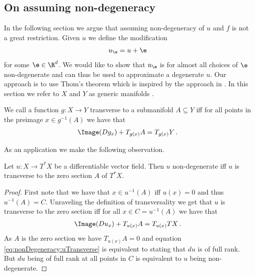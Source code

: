\subsection{On assuming non-degeneracy}

In the following section we argue that assuming non-degeneracy 
of $u$ and $f$ is not a great restriction.
Given $u$ we define the modification
\begin{align}
  u_\e=u+\e\label{eq:nonDegeneracy:definitionUEps}
\end{align}
for some $\e\in\R^d$. We would like to show that $u_\e$ is for almost all choices of $\e$ non-degenerate and can 
thus be used to approximate a degenerate $u$.
Our approach is to use Thom's theorem which is inspired by the approach in \cite[Chapter 6]{Hirsch1994}.
In this section we refer to $X$ and $Y$ as generic manifolds .
\begin{definition}[Transversality]
  We call a function $g\colon X\to Y$ transverse to a submanifold $A\subseteq Y$ iff for all points in the 
  preimage $x\in g^{-1}(A)$ we have that
  \begin{align*}
    \Image(Dg_x)+T_{g(x)}A = T_{g(x)}Y\,.
  \end{align*}
\end{definition}
As an application we make the following observation.
\begin{proposition}\label{pr:nonDegeneracy:alternativeCharacterisation}
  Let $u\colon X\to T^*X$ be a differentiable vector field.
  Then $u$ non-degenerate iff $u$ is transverse to the zero section $A$ of $T^*X$.
\end{proposition}
\begin{proof}
  First note that we have that $x\in u^{-1}(A)$ iff $u(x)=0$ and thus $u^{-1}(A)=C$.
  Unraveling the definition of transversality we get that $u$ is transverse to the zero section iff for all $x\in C=u^{-1}(A)$
  we have that
  \begin{align}
    \Image(Du_x)+T_{u(x)}A = T_{u(x)}TX\,. \label{eq:nonDegeneracy:uTransverse}
  \end{align}
  As $A$ is the zero section we have $T_{u(x)}A=0$ and equation \eqref{eq:nonDegeneracy:uTransverse}
  is equivalent to stating that $du$ is of full rank. But $du$ being of full rank at all points
  in $C$ is equivalent to $u$ being non-degenerate.
\end{proof}
